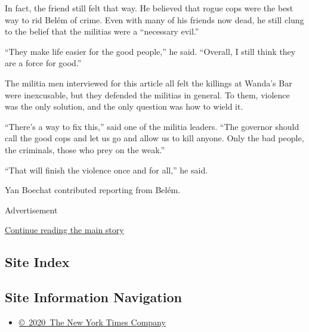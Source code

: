 In fact, the friend still felt that way. He believed that rogue cops
were the best way to rid Belém of crime. Even with many of his friends
now dead, he still clung to the belief that the militias were a
``necessary evil.''

``They make life easier for the good people,'' he said. ``Overall, I
still think they are a force for good.''

The militia men interviewed for this article all felt the killings at
Wanda's Bar were inexcusable, but they defended the militias in general.
To them, violence was the only solution, and the only question was how
to wield it.

``There's a way to fix this,'' said one of the militia leaders. ``The
governor should call the good cops and let us go and allow us to kill
anyone. Only the bad people, the criminals, those who prey on the
weak.''

``That will finish the violence once and for all,'' he said.

Yan Boechat contributed reporting from Belém.

Advertisement

\protect\hyperlink{after-bottom}{Continue reading the main story}

\hypertarget{site-index}{%
\subsection{Site Index}\label{site-index}}

\hypertarget{site-information-navigation}{%
\subsection{Site Information
Navigation}\label{site-information-navigation}}

\begin{itemize}
\tightlist
\item
  \href{https://help.nytimes.com/hc/en-us/articles/115014792127-Copyright-notice}{©~2020~The
  New York Times Company}
\end{itemize}

